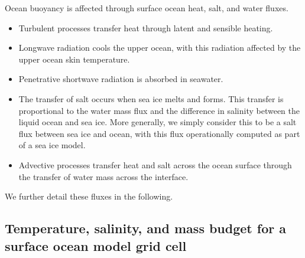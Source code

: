Ocean buoyancy is affected through surface ocean heat, salt, and water
fluxes. 
\begin{itemize}

\item Turbulent processes transfer heat through latent and sensible
  heating.

\item Longwave radiation cools the upper ocean, with this radiation
  affected by the upper ocean skin temperature.  

\item Penetrative shortwave radiation is absorbed in seawater.

\item The transfer of salt occurs when sea ice melts and forms.  This
  transfer is proportional to the water mass flux and the difference
  in salinity between the liquid ocean and sea ice.  More generally,
  we simply consider this to be a salt flux between sea ice and ocean,
  with this flux operationally computed as part of a sea ice model.

\item Advective processes transfer heat and salt across the ocean
  surface through the transfer of water mass across the interface.

\end{itemize}
  We further detail these fluxes in the following. 


\subsection{Temperature, salinity, and mass budget for a surface
  ocean model grid cell}

